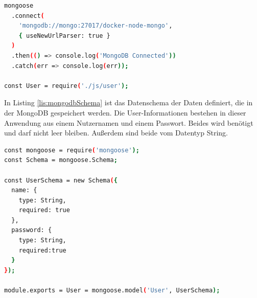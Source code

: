 \begin{lstlisting}[language=bash, caption={Verbindungsaufbau mit der MongoDB}, label=lis:mongodb]
mongoose
  .connect(
    'mongodb://mongo:27017/docker-node-mongo',
    { useNewUrlParser: true }
  )
  .then(() => console.log('MongoDB Connected'))
  .catch(err => console.log(err));

const User = require('./js/user');
\end{lstlisting}

In Listing \ref{lis:mongodbSchema} ist das Datenschema der Daten definiert, die in der MongoDB gespeichert werden. Die User-Informationen bestehen in dieser Anwendung aus einem Nutzernamen und einem Passwort. Beides wird benötigt und darf nicht leer bleiben. Außerdem sind beide vom Datentyp String.
\begin{lstlisting}[language=bash, caption={Datenschema in der MongoDB}, label=lis:mongodbSchema]
const mongoose = require('mongoose');
const Schema = mongoose.Schema;

const UserSchema = new Schema({
  name: {
    type: String,
    required: true
  },
  password: {
    type: String,
    required:true
  }
});

module.exports = User = mongoose.model('User', UserSchema);
\end{lstlisting}

